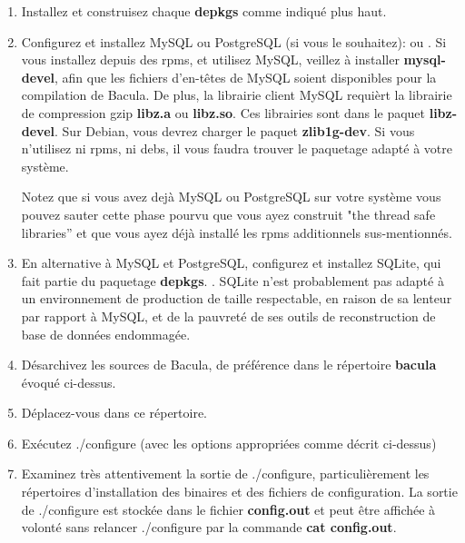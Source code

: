\begin{enumerate}
\item Installez et construisez chaque {\bf depkgs} comme indiqu\'e plus haut. 


\item Configurez et installez MySQL ou PostgreSQL (si vous le souhaitez): 
    ou  
   .  Si vous installez depuis des rpms, et
utilisez MySQL, veillez \`a  installer {\bf mysql-devel}, afin que les
fichiers d'en-t\^etes de MySQL  soient disponibles pour la compilation de
Bacula. De plus, la  librairie client MySQL requi\`ert la librairie de
compression gzip {\bf libz.a}  ou {\bf libz.so}. Ces librairies sont dans le
paquet {\bf libz-devel}.  Sur Debian, vous devrez charger le paquet {\bf
zlib1g-dev}. Si vous  n'utilisez ni rpms, ni debs, il vous faudra trouver le
paquetage  adapt\'e \`a votre syst\`eme. 

Notez que si vous avez dej\`a MySQL
ou PostgreSQL sur  votre syst\`eme vous pouvez sauter cette phase pourvu que
vous ayez construit  "the thread safe libraries'' et que vous ayez d\'ej\`a
install\'e les rpms  additionnels sus-mentionn\'es. 

\item En alternative \`a MySQL et PostgreSQL, configurez et installez SQLite, 
   qui fait partie du paquetage {\bf depkgs}.  
   . 
   SQLite n'est probablement pas adapt\'e \`a un environnement de production 
   de taille respectable, en raison de sa lenteur par rapport \`a MySQL, et de la 
   pauvret\'e de ses outils de reconstruction de base de donn\'ees endommag\'ee.

\item D\'esarchivez les sources de Bacula, de pr\'ef\'erence dans le
   r\'epertoire {\bf bacula}  \'evoqu\'e ci-dessus. 

\item D\'eplacez-vous dans ce r\'epertoire. 

\item Ex\'ecutez ./configure (avec les options appropri\'ees comme d\'ecrit
   ci-dessus) 

\item Examinez tr\`es attentivement la sortie de ./configure, 
   particuli\`erement les r\'epertoires d'installation des binaires et des 
   fichiers de configuration. La sortie de ./configure est stock\'ee dans  le
fichier {\bf config.out} et peut \^etre affich\'ee \`a volont\'e sans 
relancer ./configure par la commande {\bf cat config.out}. 


\end{enumerate}
